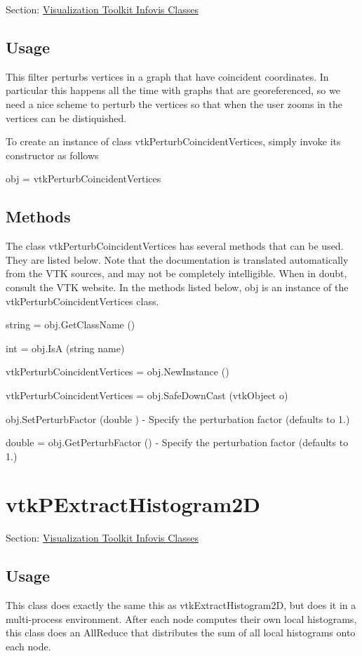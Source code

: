 Section\-: \hyperlink{sec_vtkinfovis}{Visualization Toolkit Infovis Classes} \hypertarget{vtkwidgets_vtkxyplotwidget_Usage}{}\subsection{Usage}\label{vtkwidgets_vtkxyplotwidget_Usage}
This filter perturbs vertices in a graph that have coincident coordinates. In particular this happens all the time with graphs that are georeferenced, so we need a nice scheme to perturb the vertices so that when the user zooms in the vertices can be distiquished.

To create an instance of class vtk\-Perturb\-Coincident\-Vertices, simply invoke its constructor as follows \begin{DoxyVerb}  obj = vtkPerturbCoincidentVertices
\end{DoxyVerb}
 \hypertarget{vtkwidgets_vtkxyplotwidget_Methods}{}\subsection{Methods}\label{vtkwidgets_vtkxyplotwidget_Methods}
The class vtk\-Perturb\-Coincident\-Vertices has several methods that can be used. They are listed below. Note that the documentation is translated automatically from the V\-T\-K sources, and may not be completely intelligible. When in doubt, consult the V\-T\-K website. In the methods listed below, {\ttfamily obj} is an instance of the vtk\-Perturb\-Coincident\-Vertices class. 
\begin{DoxyItemize}
\item {\ttfamily string = obj.\-Get\-Class\-Name ()}  
\item {\ttfamily int = obj.\-Is\-A (string name)}  
\item {\ttfamily vtk\-Perturb\-Coincident\-Vertices = obj.\-New\-Instance ()}  
\item {\ttfamily vtk\-Perturb\-Coincident\-Vertices = obj.\-Safe\-Down\-Cast (vtk\-Object o)}  
\item {\ttfamily obj.\-Set\-Perturb\-Factor (double )} -\/ Specify the perturbation factor (defaults to 1.)  
\item {\ttfamily double = obj.\-Get\-Perturb\-Factor ()} -\/ Specify the perturbation factor (defaults to 1.)  
\end{DoxyItemize}\hypertarget{vtkinfovis_vtkpextracthistogram2d}{}\section{vtk\-P\-Extract\-Histogram2\-D}\label{vtkinfovis_vtkpextracthistogram2d}
Section\-: \hyperlink{sec_vtkinfovis}{Visualization Toolkit Infovis Classes} \hypertarget{vtkwidgets_vtkxyplotwidget_Usage}{}\subsection{Usage}\label{vtkwidgets_vtkxyplotwidget_Usage}
This class does exactly the same this as vtk\-Extract\-Histogram2\-D, but does it in a multi-\/process environment. After each node computes their own local histograms, this class does an All\-Reduce that distributes the sum of all local histograms onto each node.


